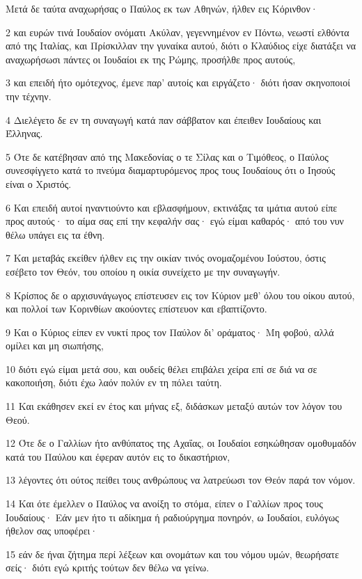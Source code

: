 \par Μετά δε ταύτα αναχωρήσας ο Παύλος εκ των Αθηνών, ήλθεν εις Κόρινθον·
\par 2 και ευρών τινά Ιουδαίον ονόματι Ακύλαν, γεγεννημένον εν Πόντω, νεωστί ελθόντα από της Ιταλίας, και Πρίσκιλλαν την γυναίκα αυτού, διότι ο Κλαύδιος είχε διατάξει να αναχωρήσωσι πάντες οι Ιουδαίοι εκ της Ρώμης, προσήλθε προς αυτούς,
\par 3 και επειδή ήτο ομότεχνος, έμενε παρ' αυτοίς και ειργάζετο· διότι ήσαν σκηνοποιοί την τέχνην.
\par 4 Διελέγετο δε εν τη συναγωγή κατά παν σάββατον και έπειθεν Ιουδαίους και Έλληνας.
\par 5 Ότε δε κατέβησαν από της Μακεδονίας ο τε Σίλας και ο Τιμόθεος, ο Παύλος συνεσφίγγετο κατά το πνεύμα διαμαρτυρόμενος προς τους Ιουδαίους ότι ο Ιησούς είναι ο Χριστός.
\par 6 Και επειδή αυτοί ηναντιούντο και εβλασφήμουν, εκτινάξας τα ιμάτια αυτού είπε προς αυτούς· το αίμα σας επί την κεφαλήν σας· εγώ είμαι καθαρός· από του νυν θέλω υπάγει εις τα έθνη.
\par 7 Και μεταβάς εκείθεν ήλθεν εις την οικίαν τινός ονομαζομένου Ιούστου, όστις εσέβετο τον Θεόν, του οποίου η οικία συνείχετο με την συναγωγήν.
\par 8 Κρίσπος δε ο αρχισυνάγωγος επίστευσεν εις τον Κύριον μεθ' όλου του οίκου αυτού, και πολλοί των Κορινθίων ακούοντες επίστευον και εβαπτίζοντο.
\par 9 Και ο Κύριος είπεν εν νυκτί προς τον Παύλον δι' οράματος· Μη φοβού, αλλά ομίλει και μη σιωπήσης,
\par 10 διότι εγώ είμαι μετά σου, και ουδείς θέλει επιβάλει χείρα επί σε διά να σε κακοποιήση, διότι έχω λαόν πολύν εν τη πόλει ταύτη.
\par 11 Και εκάθησεν εκεί εν έτος και μήνας εξ, διδάσκων μεταξύ αυτών τον λόγον του Θεού.
\par 12 Ότε δε ο Γαλλίων ήτο ανθύπατος της Αχαΐας, οι Ιουδαίοι εσηκώθησαν ομοθυμαδόν κατά του Παύλου και έφεραν αυτόν εις το δικαστήριον,
\par 13 λέγοντες ότι ούτος πείθει τους ανθρώπους να λατρεύωσι τον Θεόν παρά τον νόμον.
\par 14 Και ότε έμελλεν ο Παύλος να ανοίξη το στόμα, είπεν ο Γαλλίων προς τους Ιουδαίους· Εάν μεν ήτο τι αδίκημα ή ραδιούργημα πονηρόν, ω Ιουδαίοι, ευλόγως ήθελον σας υποφέρει·
\par 15 εάν δε ήναι ζήτημα περί λέξεων και ονομάτων και του νόμου υμών, θεωρήσατε σείς· διότι εγώ κριτής τούτων δεν θέλω να γείνω.
